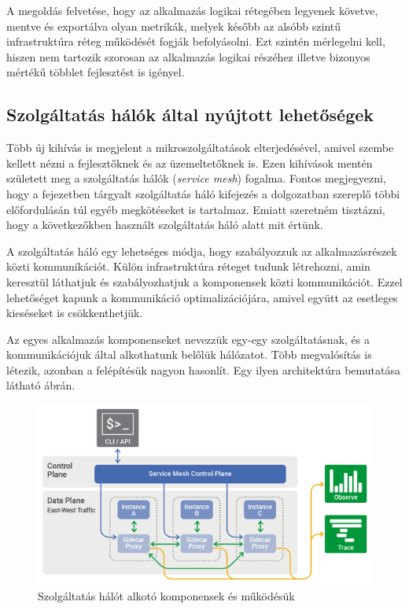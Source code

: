 A megoldás felvetése, hogy az alkalmazás logikai rétegében legyenek követve, mentve és exportálva olyan metrikák, melyek később az alsóbb szintű infrastruktúra réteg működését fogják befolyásolni.
Ezt szintén mérlegelni kell, hiszen nem tartozik szorosan az alkalmazás logikai részéhez illetve bizonyos mértékű többlet fejlesztést is igényel.

\subsection{Szolgáltatás hálók által nyújtott lehetőségek}
Több új kihívás is megjelent a mikroszolgáltatások elterjedésével, amivel szembe kellett nézni a fejlesztőknek és az üzemeltetőknek is.
Ezen kihívások mentén született meg a szolgáltatás hálók (\textit{service mesh}) fogalma. 
Fontos megjegyezni, hogy a fejezetben tárgyalt szolgáltatás háló kifejezés a dolgozatban szereplő többi előfordulásán túl egyéb megkötéseket is tartalmaz.
Emiatt szeretném tisztázni, hogy a következőkben használt szolgáltatás háló alatt mit értünk.

A szolgáltatás háló egy lehetséges módja, hogy szabályozzuk az alkalmazásrészek közti kommunikációt. 
Külön infrastruktúra réteget tudunk létrehozni, amin keresztül láthatjuk és szabályozhatjuk a komponensek közti kommunikációt.
Ezzel lehetőséget kapunk a kommunikáció optimalizációjára, amivel együtt az esetleges kieséseket is csökkenthetjük\citep{serviceMeshDefinition}.

Az egyes alkalmazás komponenseket nevezzük egy-egy szolgáltatásnak, és a kommunikációjuk által alkothatunk belőlük hálózatot.
Több megvalósítás is létezik, azonban a felépítésük nagyon hasonlít.
Egy ilyen architektúra bemutatása látható  ábrán.

\begin{figure}[!ht]
\centering
\includegraphics[width=150mm, keepaspectratio]{figures/service-mesh-generic-topology.png}
\caption{Szolgáltatás hálót alkotó komponensek és működésük\citep{serviceMeshTopology}}
\label{fig:serviceMesh-topology}
\end{figure}

